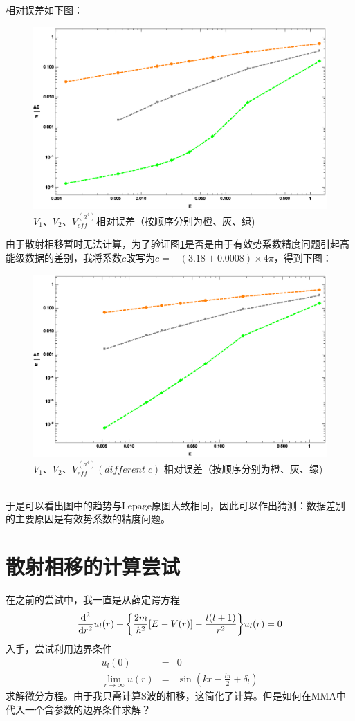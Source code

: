 \documentclass{ctexart}
\begin{document}
相对误差如下图：
\clearpage
\begin{figure}[!htbp]
  \centering
  \includegraphics[width=5.2in]{Test_LepageFigure_2.eps}
  \caption{$V_1$、$V_2$、$V_{eff}^{(a^4)}$相对误差（按顺序分别为橙、灰、绿)}\label{relative error 2}
\end{figure}
由于散射相移暂时无法计算，为了验证图\ref{relative error 2}是否是由于有效势系数精度问题引起高能级数据的差别，我将系数$c$改写为$c=-(3.18+0.0008)\times4\pi$，得到下图：
\begin{figure}[!htbp]
  \centering
  \includegraphics[width=5.2in]{Test_LepageFigure_2_2.eps}
  \caption{$V_1$、$V_2$、$V_{eff}^{(a^4)}(different\;c)$ 相对误差（按顺序分别为橙、灰、绿)}\label{relative error 2_2}
\end{figure}\\
于是可以看出图中的趋势与Lepage原图大致相同，因此可以作出猜测：数据差别的主要原因是有效势系数的精度问题。
\section{散射相移的计算尝试}
在之前的尝试中，我一直是从薛定谔方程
\begin{equation}\label{Schrodinger}
\dv[2]{r}u_l(r)+\Bqty{\frac{2m}{\hbar^2}\bqty{E-V(r)}-\frac{l(l+1)}{r^2}}u_l(r)=0
\end{equation}
入手，尝试利用边界条件
\begin{eqnarray}
  u_l(0) &=& 0 \\
  \lim_{r\to\infty}u(r) &=& \sin(kr-\frac{l\pi}{2}+\delta_l)
\end{eqnarray}
求解微分方程。由于我只需计算S波的相移，这简化了计算。但是如何在MMA中代入一个含参数的边界条件求解？
\end{document}
